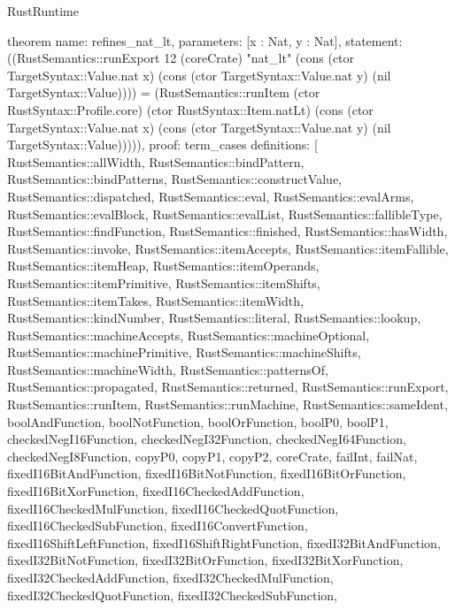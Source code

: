 \begin{lexlean}{RustRuntime}
\begin{semanticmodule}
theorem{
  name: refines_nat_lt,
  parameters: [x : Nat, y : Nat],
  statement: ((RustSemantics::runExport 12 (coreCrate) "nat_lt" (cons (ctor TargetSyntax::Value.nat x) (cons (ctor TargetSyntax::Value.nat y) (nil TargetSyntax::Value)))) = (RustSemantics::runItem (ctor RustSyntax::Profile.core) (ctor RustSyntax::Item.natLt) (cons (ctor TargetSyntax::Value.nat x) (cons (ctor TargetSyntax::Value.nat y) (nil TargetSyntax::Value))))),
  proof: term_cases{
    definitions: [
      RustSemantics::allWidth,
      RustSemantics::bindPattern,
      RustSemantics::bindPatterns,
      RustSemantics::constructValue,
      RustSemantics::dispatched,
      RustSemantics::eval,
      RustSemantics::evalArms,
      RustSemantics::evalBlock,
      RustSemantics::evalList,
      RustSemantics::fallibleType,
      RustSemantics::findFunction,
      RustSemantics::finished,
      RustSemantics::hasWidth,
      RustSemantics::invoke,
      RustSemantics::itemAccepts,
      RustSemantics::itemFallible,
      RustSemantics::itemHeap,
      RustSemantics::itemOperands,
      RustSemantics::itemPrimitive,
      RustSemantics::itemShifts,
      RustSemantics::itemTakes,
      RustSemantics::itemWidth,
      RustSemantics::kindNumber,
      RustSemantics::literal,
      RustSemantics::lookup,
      RustSemantics::machineAccepts,
      RustSemantics::machineOptional,
      RustSemantics::machinePrimitive,
      RustSemantics::machineShifts,
      RustSemantics::machineWidth,
      RustSemantics::patternsOf,
      RustSemantics::propagated,
      RustSemantics::returned,
      RustSemantics::runExport,
      RustSemantics::runItem,
      RustSemantics::runMachine,
      RustSemantics::sameIdent,
      boolAndFunction,
      boolNotFunction,
      boolOrFunction,
      boolP0,
      boolP1,
      checkedNegI16Function,
      checkedNegI32Function,
      checkedNegI64Function,
      checkedNegI8Function,
      copyP0,
      copyP1,
      copyP2,
      coreCrate,
      failInt,
      failNat,
      fixedI16BitAndFunction,
      fixedI16BitNotFunction,
      fixedI16BitOrFunction,
      fixedI16BitXorFunction,
      fixedI16CheckedAddFunction,
      fixedI16CheckedMulFunction,
      fixedI16CheckedQuotFunction,
      fixedI16CheckedSubFunction,
      fixedI16ConvertFunction,
      fixedI16ShiftLeftFunction,
      fixedI16ShiftRightFunction,
      fixedI32BitAndFunction,
      fixedI32BitNotFunction,
      fixedI32BitOrFunction,
      fixedI32BitXorFunction,
      fixedI32CheckedAddFunction,
      fixedI32CheckedMulFunction,
      fixedI32CheckedQuotFunction,
      fixedI32CheckedSubFunction,
}}
\end{semanticmodule}
\end{lexlean}
